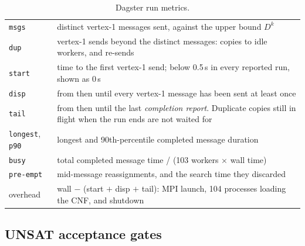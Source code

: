 \documentclass[11pt,a4paper]{article}
\theoremstyle{definition}
\newcommand{\code}[1]{\texttt{#1}}
\begin{document}
\begin{table}[H]
\centering
\small
\begin{tabular}{@{}l p{12cm}@{}}
\toprule
\code{msgs} & distinct vertex-1 messages sent, against the upper bound $D^k$ \\
\code{dup} & vertex-1 sends beyond the distinct messages: copies to idle workers, and re-sends \\
\code{start} & time to the first vertex-1 send; below 0.5\,s in every reported run, shown as 0\,s \\
\code{disp} & from then until every vertex-1 message has been sent at least once \\
\code{tail} & from then until the last \emph{completion report}. Duplicate copies still in
flight when the run ends are not waited for \\
\code{longest}, \code{p90} & longest and 90th-percentile completed message duration \\
\code{busy} & total completed message time / (103 workers $\times$ wall time) \\
\code{pre-empt} & mid-message reassignments, and the search time they discarded \\
overhead & wall $-$ (start $+$ disp $+$ tail): MPI launch, 104 processes loading the CNF,
and shutdown \\
\bottomrule
\end{tabular}
\caption{Dagster run metrics.}
\label{tab:metrics}
\end{table}

\subsection{UNSAT acceptance gates}\label{sec:gates}
\end{document}
